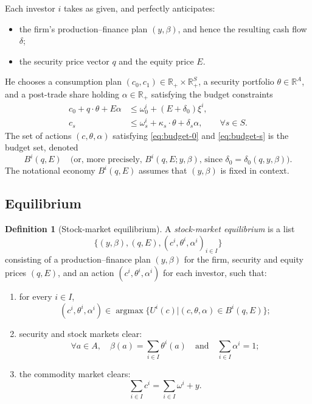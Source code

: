 \documentclass[11pt,a4paper,oneside]{book}
\def\R{\mathbb{R}}
\def\leq{\leqslant}
\def\et{\quad \text{and} \quad}
\DeclareMathOperator*{\argmax}{argmax}
\theoremstyle{plain}
\theoremstyle{definition}
\newtheorem{definition}[theorem]{Definition}
\theoremstyle{remark}
\numberwithin{equation}{chapter}
\begin{document}
Each investor $i$ takes as given, and perfectly anticipates:
\begin{itemize}
  \item the firm's production--finance plan $(y, \beta)$, and hence the resulting cash flow $\delta$;
  \item the security price vector $q$ and the equity price $E$.
\end{itemize}
He chooses a consumption plan $(c_0, c_1) \in \R_+ \times \R_+^S$, a security portfolio $\theta \in \R^A$, and a post-trade share holding $\alpha \in \R_+$ satisfying the budget constraints
\begin{align}
  c_0 + q \cdot \theta + E \alpha &\leq \omega^i_0 + (E + \delta_0) \xi^i,
  \label{eq:budget-0}\\[2pt]
  c_s &\leq \omega^i_s + \kappa_s \cdot \theta + \delta_s \alpha,
  \qquad \forall s \in S.
  \label{eq:budget-s}
\end{align}
The set of actions $(c, \theta, \alpha)$ satisfying \eqref{eq:budget-0} and \eqref{eq:budget-s} is the budget set, denoted
\begin{equation*}
  B^i(q, E) \quad \text{(or, more precisely, } B^i(q, E; y, \beta) \text{, since } \delta_0 = \delta_0(q, y, \beta) \text{).}
\end{equation*}
The notational economy $B^i(q, E)$ assumes that $(y, \beta)$ is fixed in context.

\subsection{Equilibrium}

\begin{definition}[Stock-market equilibrium]\label{def:equilibrium}
A \emph{stock-market equilibrium} is a list
\begin{equation*}
  \bigl\{ (y, \beta), (q, E), (c^i, \theta^i, \alpha^i)_{i \in I} \bigr\}
\end{equation*}
consisting of a production--finance plan $(y, \beta)$ for the firm, security and equity prices $(q, E)$, and an action $(c^i, \theta^i, \alpha^i)$ for each investor, such that:
\begin{enumerate}
  \item[(a)] for every $i \in I$,
  \begin{equation*}
    (c^i, \theta^i, \alpha^i) \in \argmax \bigl\{ U^i(c) \vert (c, \theta, \alpha) \in B^i(q, E) \bigr\};
  \end{equation*}
  \item[(b)] security and stock markets clear:
  \begin{equation*}
    \forall a \in A, \quad \beta(a) = \sum_{i \in I} \theta^i(a)
    \et
    \sum_{i \in I} \alpha^i = 1;
  \end{equation*}
  \item[(c)] the commodity market clears:
  \begin{equation*}
    \sum_{i \in I} c^i = \sum_{i \in I} \omega^i + y.
  \end{equation*}
\end{enumerate}
\end{definition}
\end{document}
